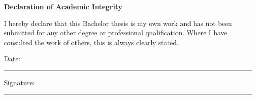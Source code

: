 \thispagestyle{empty}
\begin{center}
\textbf{Declaration of Academic Integrity}
\end{center}

I hereby declare that this Bachelor thesis is my own work and has not been submitted for any other degree or professional qualification. Where I have consulted the work of others, this is always clearly stated.

\vspace{2cm}
\noindent Date: \rule{4cm}{0.4pt} \hfill Signature: \rule{5cm}{0.4pt}

\clearpage
